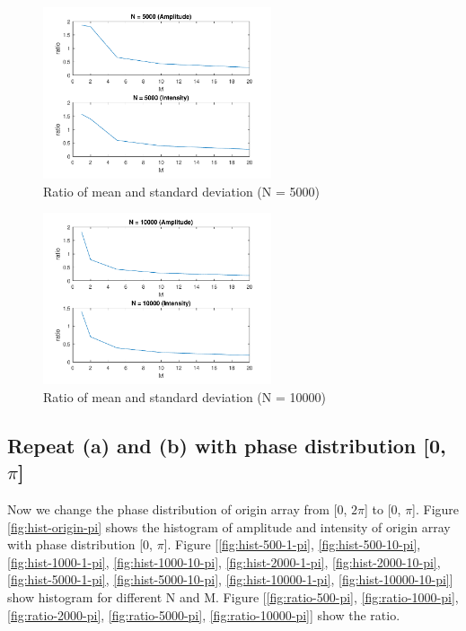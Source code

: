 \documentclass{article}
\begin{document}
\begin{figure}[H]
	\centering
	\includegraphics[width = 0.6\textwidth]{src/2pi/ratio_5000.pdf}
	\caption{Ratio of mean and standard deviation (N = 5000)}
	\label{fig:ratio-5000}
\end{figure}
\begin{figure}[H]
	\centering
	\includegraphics[width = 0.6\textwidth]{src/2pi/ratio_10000.pdf}
	\caption{Ratio of mean and standard deviation (N = 10000)}
	\label{fig:ratio-10000}
\end{figure}

\subsection{Repeat (a) and (b) with phase distribution [0, $\pi$]}
Now we change the phase distribution of origin array from [0, $2\pi$] to [0, $\pi$]. Figure \ref{fig:hist-origin-pi} shows the histogram of 
amplitude and intensity of origin array with phase distribution [0, $\pi$]. 
Figure [\ref{fig:hist-500-1-pi}, \ref{fig:hist-500-10-pi}, \ref{fig:hist-1000-1-pi}, \ref{fig:hist-1000-10-pi}, \ref{fig:hist-2000-1-pi}, 
\ref{fig:hist-2000-10-pi}, \ref{fig:hist-5000-1-pi}, \ref{fig:hist-5000-10-pi}, \ref{fig:hist-10000-1-pi}, \ref{fig:hist-10000-10-pi}]
show histogram for different N and M.  Figure [\ref{fig:ratio-500-pi}, \ref{fig:ratio-1000-pi}, \ref{fig:ratio-2000-pi}, \ref{fig:ratio-5000-pi}, 
\ref{fig:ratio-10000-pi}] show the ratio.
\end{document}
